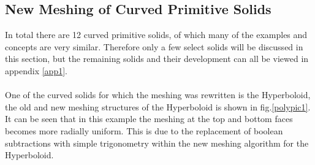 \documentclass[12pt,a4paper]{article}
\begin{document}
\subsection{New Meshing of Curved Primitive Solids}
In total there are 12 curved primitive solids, of which many of the examples and concepts are very similar. Therefore only a few select solids will be discussed in this section, but the remaining solids and their development can all be viewed in appendix \ref{app1}.
\\\\
One of the curved solids for which the meshing was rewritten is the Hyperboloid, the old and new meshing structures of the Hyperboloid is shown in fig.\ref{polypic1}. It can be seen that in this example the meshing at the top and bottom faces becomes more radially uniform. This is due to the replacement of boolean subtractions with simple trigonometry within the new meshing algorithm for the Hyperboloid.
\\\\
\end{document}

